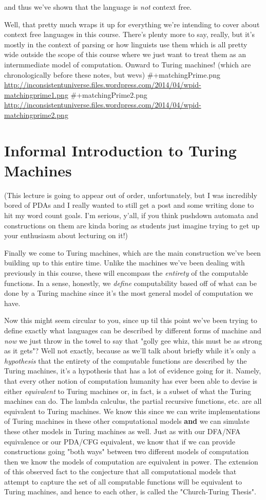 \documentclass[11pt]{article}
\begin{document}
and thus we've shown that the language is \emph{not} context free.

Well, that pretty much wraps it up for everything we're intending to cover about context free languages in this course. There's plenty more to say, really, but it's mostly in the context of parsing or how linguists use them which is all pretty wide outside the scope of this course where we just want to treat them as an intermmediate model of computation. Onward to Turing machines! (which are chronologically before these notes, but wevs)
\#+matchingPrime.png \url{http://inconsistentuniverse.files.wordpress.com/2014/04/wpid-matchingprime1.png}
\#+matchingPrime2.png \url{http://inconsistentuniverse.files.wordpress.com/2014/04/wpid-matchingprime2.png}
\section{Informal Introduction to Turing Machines}
\label{sec-9}
(This lecture is going to appear out of order, unfortunately, but I was incredibly bored of PDAs and I really wanted to still get a post and some writing done to hit my word count goals. I'm serious, y'all, if you think pushdown automata and constructions on them are kinda boring as students just imagine trying to get up your enthusiasm about lecturing on it!)

Finally we come to Turing machines, which are the main construction we've been building up to this entire time. Unlike the machines we've been dealing with previously in this course, these will encompass the \emph{entirety} of the computable functions. In a sense, honestly, we \emph{define} computability based off of what can be done by a Turing machine since it's the most general model of computation we have. 

Now this might seem circular to you, since up til this point we've been trying to define exactly what languages can be described by different forms of machine and \emph{now} we just throw in the towel to say that "golly gee whiz, this must be as strong as it gets"? Well not exactly, because as we'll talk about briefly while it's only a \emph{hypothesis} that the entirety of the computable functions are described by the Turing machines, it's a hypothesis that has a lot of evidence going for it. Namely, that every other notion of computation humanity has ever been able to devise is either \emph{equivalent} to Turing machines or, in fact, is a subset of what the Turing machines can do. The lambda calculus, the partial recursive functions, etc. are all equivalent to Turing machines. We know this since we can write implementations of Turing machines in these other computational models \textbf{and} we can simulate these other models in Turing machines as well. Just as with our DFA/NFA equivalence or our PDA/CFG equivalent, we know that if we can provide constructions going "both ways" between two different models of computation then we know the models of computation are equivalent in power. The extension of this observed fact to the conjecture that all computational models that attempt to capture the set of all computable functions will be equivalent to Turing machines, and hence to each other, is called the "Church-Turing Thesis".
\end{document}
